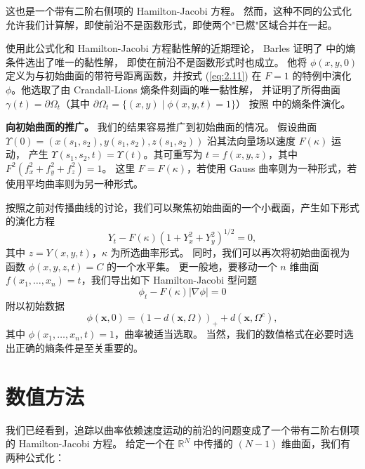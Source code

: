 \documentclass[11pt,a4paper]{article}
\begin{document}
这也是一个带有二阶右侧项的 Hamilton-Jacobi 方程。
然而，这种不同的公式化允许我们计算解，即使前沿不是函数形式，即使两个"已燃"区域合并在一起。

使用此公式化和 Hamilton-Jacobi 方程黏性解的近期理论，
Barles \cite{barles1985} 证明了 \cite{sethian1982} 中的熵条件选出了唯一的黏性解，
即使在前沿不是函数形式时也成立。
他将 $\phi(x,y,0)$ 定义为与初始曲面的带符号距离函数，并按式 (\ref{eq:2.11}) 
在 $F=1$ 的特例中演化 $\phi$。他选取了由 Crandall-Lions \cite{crandall1984} 熵条件刻画的唯一黏性解，
并证明了所得曲面 $\gamma(t) = \partial\Omega_t$（其中 $\partial\Omega_t = \{(x,y) \mid \phi(x,y,t) = 1\}$）
按照 \cite{sethian1982} 中的熵条件演化。

\textbf{向初始曲面的推广。}
我们的结果容易推广到初始曲面的情况。
假设曲面 $\Upsilon(0) = (x(s_1,s_2), y(s_1,s_2), z(s_1,s_2))$ 沿其法向量场以速度 $F(\kappa)$ 运动，
产生 $\Upsilon(s_1,s_2,t) = \Upsilon(t)$。其可重写为 $t = f(x,y,z)$，其中 $F^2(f_x^2 + f_y^2 + f_z^2) = 1$。
这里 $F = F(\kappa)$，若使用 Gauss 曲率则为一种形式，若使用平均曲率则为另一种形式。

按照之前对传播曲线的讨论，我们可以聚焦初始曲面的一个小截面，产生如下形式的演化方程
\begin{equation}
Y_t - F(\kappa)(1 + Y_x^2 + Y_y^2)^{1/2} = 0,
\label{eq:2.12}
\end{equation}
其中 $z = Y(x,y,t)$，$\kappa$ 为所选曲率形式。
同时，我们可以再次将初始曲面视为函数 $\phi(x,y,z,t) = C$ 的一个水平集。
更一般地，要移动一个 $n$ 维曲面 $f(x_1, \ldots, x_n) = t$，我们导出如下 Hamilton-Jacobi 型问题
\begin{equation}
\phi_t - F(\kappa)|\nabla\phi| = 0
\label{eq:2.13}
\end{equation}
附以初始数据
\begin{equation}
\phi(\mathbf{x},0) = (1 - d(\mathbf{x},\Omega))_+ + d(\mathbf{x},\Omega^c),
\end{equation}
其中 $\phi(x_1, \ldots, x_n, t) = 1$，曲率被适当选取。
当然，我们的数值格式在必要时选出正确的熵条件是至关重要的。

\section{数值方法}
\label{sec:numerical}

我们已经看到，追踪以曲率依赖速度运动的前沿的问题变成了一个带有二阶右侧项的 Hamilton-Jacobi 方程。
给定一个在 $\mathbb{R}^N$ 中传播的 $(N-1)$ 维曲面，我们有两种公式化：
\end{document}
